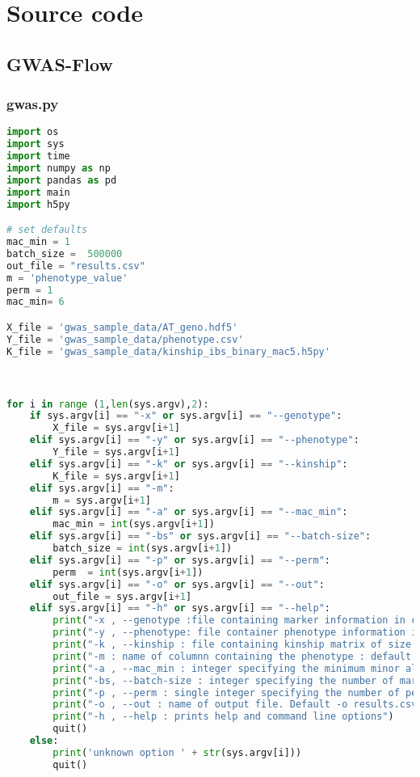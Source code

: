 

\chapter{Source code} %

\label{AppendixA} %

\linespread{1.5}
\section{GWAS-Flow}
\subsection{gwas.py}
\begin{lstlisting}[language=Python]
import os
import sys
import time
import numpy as np
import pandas as pd
import main
import h5py

# set defaults 
mac_min = 1
batch_size =  500000 
out_file = "results.csv"
m = 'phenotype_value'
perm = 1
mac_min= 6

X_file = 'gwas_sample_data/AT_geno.hdf5'
Y_file = 'gwas_sample_data/phenotype.csv'
K_file = 'gwas_sample_data/kinship_ibs_binary_mac5.h5py'



for i in range (1,len(sys.argv),2):
    if sys.argv[i] == "-x" or sys.argv[i] == "--genotype":
        X_file = sys.argv[i+1]
    elif sys.argv[i] == "-y" or sys.argv[i] == "--phenotype":
        Y_file = sys.argv[i+1]
    elif sys.argv[i] == "-k" or sys.argv[i] == "--kinship":
        K_file = sys.argv[i+1]
    elif sys.argv[i] == "-m":
        m = sys.argv[i+1]
    elif sys.argv[i] == "-a" or sys.argv[i] == "--mac_min":
        mac_min = int(sys.argv[i+1])
    elif sys.argv[i] == "-bs" or sys.argv[i] == "--batch-size":
        batch_size = int(sys.argv[i+1])
    elif sys.argv[i] == "-p" or sys.argv[i] == "--perm":
        perm  = int(sys.argv[i+1])
    elif sys.argv[i] == "-o" or sys.argv[i] == "--out":
        out_file = sys.argv[i+1]
    elif sys.argv[i] == "-h" or sys.argv[i] == "--help":
        print("-x , --genotype :file containing marker information in csv or hdf5 format of size")
        print("-y , --phenotype: file container phenotype information in csv format"  )
        print("-k , --kinship : file containing kinship matrix of size k X k in csv or hdf5 format")
        print("-m : name of columnn containing the phenotype : default m = phenotype_value")
        print("-a , --mac_min : integer specifying the minimum minor allele count necessary for a marker to be included. Default a = 1" )
        print("-bs, --batch-size : integer specifying the number of markers processed at once. Default -bs 500000" )
        print("-p , --perm : single integer specifying the number of permutations. Default 1 == no perm ")
        print("-o , --out : name of output file. Default -o results.csv  ")
        print("-h , --help : prints help and command line options")
        quit()
    else:
        print('unknown option ' + str(sys.argv[i]))
        quit()




\end{lstlisting}
